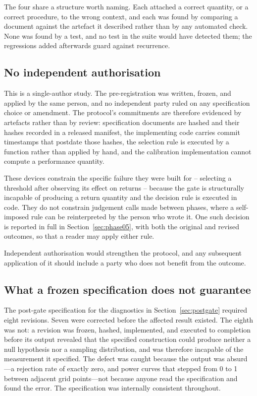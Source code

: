 \documentclass[12pt,letterpaper]{article}
\begin{document}
The four share a structure worth naming. Each attached a correct quantity, or a correct
procedure, to the wrong context, and each was found by comparing a document against the artefact it described rather than
by any automated check. None was found by a test, and no test in the suite would have
detected them; the regressions added afterwards guard against recurrence.

\subsection{No independent authorisation}
\label{sec:no-independent-authorisation}

This is a single-author study. The pre-registration was written, frozen, and applied by
the same person, and no independent party ruled on any specification choice or
amendment. The protocol's commitments are therefore evidenced by artefacts rather than
by review: specification documents are hashed and their hashes recorded in a released
manifest, the implementing code carries commit timestamps that postdate those hashes,
the selection rule is executed by a function rather than applied by hand, and the
calibration implementation cannot compute a performance quantity.

These devices constrain the specific failure they were built for -- selecting a
threshold after observing its effect on returns -- because the gate is structurally
incapable of producing a return quantity and the decision rule is executed in code.
They do not constrain judgement calls made between phases, where a self-imposed rule
can be reinterpreted by the person who wrote it. One such decision is reported in full
in Section~\ref{sec:phase05}, with both the original and revised outcomes, so that a reader may apply
either rule.

Independent authorisation would strengthen the protocol, and any subsequent application
of it should include a party who does not benefit from the outcome.

\subsection{What a frozen specification does not guarantee}
\label{sec:freezelimits}

The post-gate specification for the diagnostics in Section~\ref{sec:postgate} required
eight revisions. Seven were corrected before the affected result existed. The eighth was
not: a revision was frozen, hashed, implemented, and executed to completion before its
output revealed that the specified construction could produce neither a null hypothesis
nor a sampling distribution, and was therefore incapable of the measurement it specified.
The defect was caught because the output was absurd---a rejection rate of exactly zero,
and power curves that stepped from 0 to 1 between adjacent grid points---not because
anyone read the specification and found the error. The specification was internally
consistent throughout.
\end{document}
